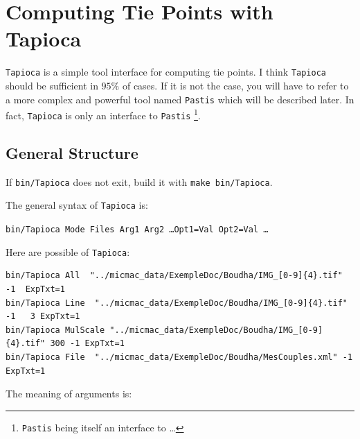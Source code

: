 



\section{Computing Tie Points with Tapioca}

{\tt Tapioca} is a simple tool interface for computing tie points.
I think {\tt Tapioca}  should be sufficient in $95\%$ of cases.
If it is not the case, you will have to refer to a more complex and powerful
tool named {\tt Pastis} which will be described later.
In fact, {\tt Tapioca} is only an interface to {\tt Pastis}
\footnote{{\tt Pastis}  being itself an interface to \SiftPP \dots}.

\label{Tapioca}


\subsection{General Structure}

If {\tt bin/Tapioca} does not exit, build it with {\tt make bin/Tapioca}.

The general syntax of {\tt Tapioca} is:

\begin{center}
   {\tt bin/Tapioca   Mode  Files  Arg1 Arg2  \dots Opt1=Val Opt2=Val \dots}
\end{center}

Here are possible  of {\tt Tapioca}:

{\scriptsize
\begin{verbatim}
bin/Tapioca All  "../micmac_data/ExempleDoc/Boudha/IMG_[0-9]{4}.tif" -1  ExpTxt=1
bin/Tapioca Line  "../micmac_data/ExempleDoc/Boudha/IMG_[0-9]{4}.tif" -1   3 ExpTxt=1
bin/Tapioca MulScale "../micmac_data/ExempleDoc/Boudha/IMG_[0-9]{4}.tif" 300 -1 ExpTxt=1
bin/Tapioca File  "../micmac_data/ExempleDoc/Boudha/MesCouples.xml" -1  ExpTxt=1
\end{verbatim}
}


The meaning of arguments is:

